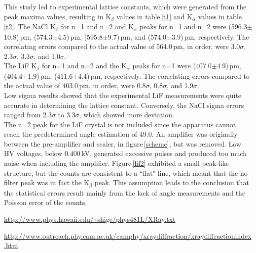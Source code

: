 \documentclass[aps,prl,twocolumn,superscriptaddress,nofootinbib]{revtex4-1}
\begin{document}
This study led to experimental lattice constants, which were generated from the peak maxima values, resulting in K$_\beta$ values in table\,\ref{t1} and K$_\alpha$ values in table\,\ref{t2}. The NaCl K$_\beta$ for n=1 and n=2 and K$_\alpha$ peaks for n=1 and n=2 were (596.3$\pm$10.8)\,pm, (574.3$\pm$4.5)\,pm, (595.8$\pm$9.7)\,pm, and (574.0$\pm$3.9)\,pm, respectively. The correlating errors compared to the actual value of 564.0\,pm, in order, were 3.0$\sigma$, 2.3$\sigma$, 3.3$\sigma$, and 1.0$\sigma$. 
\\
\indent The LiF K$_\beta$ for n=1 and n=2 and the K$_\alpha$ peaks for n=1 were (407.0$\pm$4.9)\,pm, (404.4$\pm$1.9)\,pm, (411.6$\pm$4.4)\,pm, respectively. The correlating errors compared to the actual value of 403.0\,pm, in order, were 0.8$\sigma$, 0.8$\sigma$, and 1.9$\sigma$.
\\
\indent Low sigma results showed that the experimental LiF measurements were quite accurate in determining the lattice constant. Conversely, the NaCl sigma errors ranged from 2.3$\sigma$ to 3.3$\sigma$, which showed more deviation.
\\
\indent The n=2 peak for the LiF crystal is not included since the apparatus cannot reach the predetermined angle estimation of 49.0\degree. An amplifier was originally between the pre-amplifier and scaler, in figure\,\ref{scheme}, but was removed. Low HV voltages, below 0.400\,kV, generated excessive pulses and produced too much noise when including the amplifier. Figure\,\ref{lif2} exhibited a small peak-like structure, but the counts are consistent to a ``flat" line, which meant that the no-filter peak was in fact the K$_\beta$ peak. This assumption leads to the conclusion that the statistical errors result mainly from the lack of angle measurements and the Poisson error of the counts.



\setlength{\parindent}{0cm}

\begin{thebibliography}{99}  %

 \url{http://www.phys.hawaii.edu/~shige/phys481L/XRay.txt}    %

 \url{http://www.outreach.phy.cam.ac.uk/camphy/xraydiffraction/xraydiffractionindex.htm}






\end{thebibliography}
\end{document}
